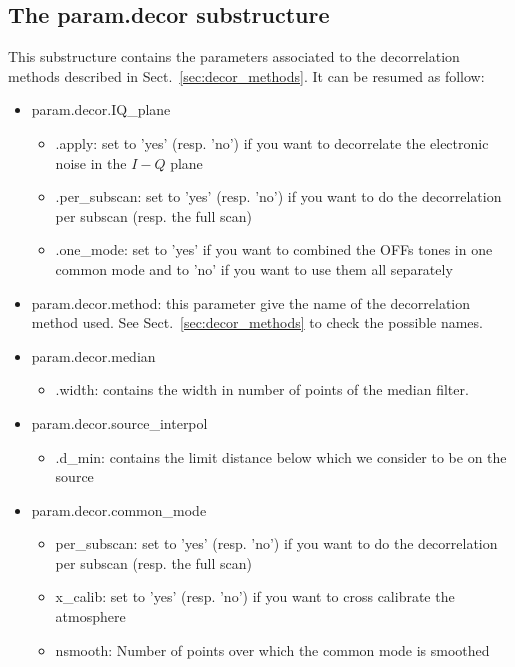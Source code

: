 \documentclass[a4paper]{article}
\begin{document}
\subsection{The param.decor substructure }
\label{sec:param_decor}
This substructure contains the parameters associated to the decorrelation methods described in Sect.~\ref{sec:decor_methods}. It can be resumed as follow:
\begin{itemize}
\item {\color{blue} param.decor.IQ\_plane}
	\begin{itemize}
	\item {\color{blue} .apply}: set to 'yes' (resp. 'no') if you want to decorrelate the electronic noise in the $I-Q$ plane
	\item {\color{blue} .per\_subscan}: set to 'yes' (resp. 'no') if you want to do the decorrelation per subscan (resp. the full scan)
	\item {\color{blue} .one\_mode}: set to 'yes' if you want to combined the OFFs tones in one common mode and to 'no' if you want to use them all separately 
	\end{itemize}
	\item {\color{blue} param.decor.method}: this parameter give the name of the decorrelation method used. See Sect.~\ref{sec:decor_methods} to check the possible names.
\item {\color{blue} param.decor.median}
	\begin{itemize}
	\item {\color{blue} .width}: contains the width in number of points of the median filter.
	\end{itemize}
\item {\color{blue} param.decor.source\_interpol} 
	\begin{itemize}
	\item {\color{blue} .d\_min}: contains the limit distance below which we consider to be on the source
	\end{itemize}
\item {\color{blue} param.decor.common\_mode}
	\begin{itemize}
	\item {\color{blue} per\_subscan}: set to 'yes' (resp. 'no') if you want to do the decorrelation per subscan (resp. the full scan)
        \item {\color{blue} x\_calib}: set to 'yes' (resp. 'no') if you want to cross calibrate the atmosphere
        \item {\color{blue} nsmooth}: Number of points over which the common mode is smoothed

\end{itemize}
\end{itemize}
\end{document}
